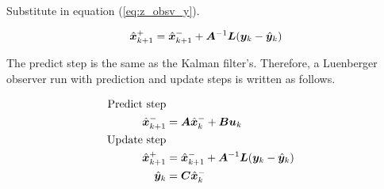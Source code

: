 Substitute in equation (\ref{eq:z_obsv_y}).

\begin{equation*}
  \hat{\bm x}_{k+1}^+ = \hat{\bm x}_{k+1}^- + \bm A^{-1}\bm L
    (\bm y_k - \hat{\bm y}_k)
\end{equation*}

The predict step is the same as the Kalman filter's. Therefore, a Luenberger
observer run with prediction and update steps is written as follows.

\begin{align}
  \text{Predict step} \nonumber \\
  \hat{\bm x}_{k+1}^- &= \bm A\hat{\bm x}_k^- + \bm B\bm u_k \\
  \text{Update step} \nonumber \\
  \hat{\bm x}_{k+1}^+ &= \hat{\bm x}_{k+1}^- + \bm A^{-1}\bm L
    (\bm y_k - \hat{\bm y}_k) \\
  \hat{\bm y}_k &= \bm C \hat{\bm x}_k^-
\end{align}
